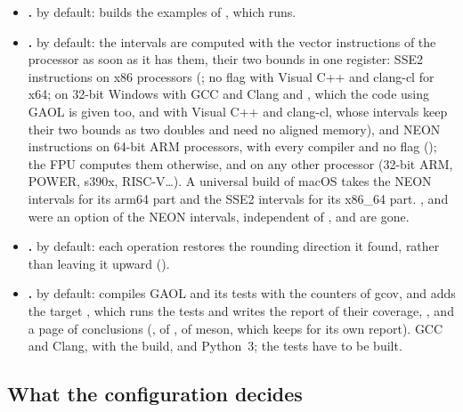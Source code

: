 \documentclass[12pt,a4paper,twoside,openright]{book}
\begin{document}
\begin{itemize}
  the unit tests of , which  and 
  run ().
\item[$\bullet$] \textbf{.}  by default:
  builds the examples of , which  runs.
\item[$\bullet$] \textbf{.}  by default: the
  intervals are computed with the vector instructions of the processor as
  soon as it has them, their two bounds in one register: SSE2 instructions on
  x86 processors (; no flag with Visual C++ and
  clang-cl for x64; on 32-bit Windows with GCC and Clang and
  , which the code using GAOL is given too, and with
  Visual C++ and clang-cl, whose intervals keep their two bounds as two
  doubles and need no aligned memory), and NEON instructions on 64-bit ARM
  processors, with every compiler and no flag (); the FPU
  computes them otherwise, and on any other processor (32-bit ARM, POWER,
  s390x, RISC-V\ldots). A universal build of macOS takes the NEON intervals
  for its arm64 part and the SSE2 intervals for its x86\_64 part.
  ,  and  were
  an option of the NEON intervals, independent of , and
  are gone.\newinvfive
{}%
%
\item[$\bullet$] \textbf{.}  by
  default: each operation restores the rounding direction it found, rather
  than leaving it upward ().
%
\item[$\bullet$] \textbf{.}  by default:
  compiles GAOL and its tests with the counters of gcov, and adds the target
  , which runs the tests and writes the report of their
  coverage, , and a page of conclusions
  (,  of
  ,  of meson, which keeps
   for its own report). GCC and Clang, with the 
  build,  and Python~3; the tests have to be built.
%
\end{itemize}

\subsection{What the configuration decides}\label{sec:install-decides}
\end{document}
